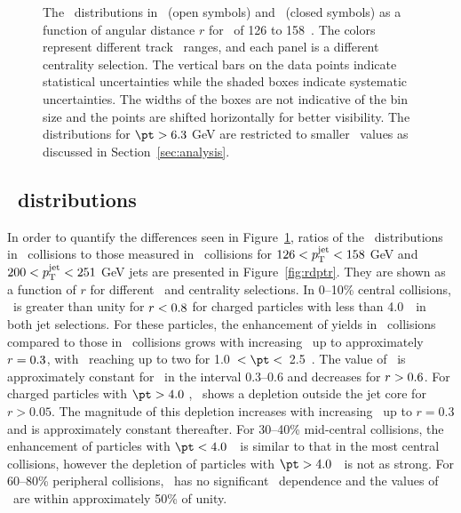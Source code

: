 \begin{figure}[h]
{\begin{tabular}{ccc}
\end{tabular}
}
\caption{The \Dptr\ distributions in \pp\ (open symbols) and \pbpb\ (closed symbols) as a function of angular distance $r$ for \ptjet\ of 126 to 158~\GeV.
The colors represent different track \pt\ ranges, and each panel is a different centrality selection.
The vertical bars on the data points indicate statistical uncertainties while the shaded boxes indicate systematic uncertainties.
The widths of the boxes are not indicative of the bin size and the points are shifted horizontally for better visibility.
The distributions for $\pt > 6.3$ GeV are restricted to smaller \rvar\ values as discussed in Section~\ref{sec:analysis}.}
\label{fig:dptr}
\end{figure}



\subsection{\RDptr\ distributions}
\label{sec:rdptr}
In order to quantify the differences seen in Figure~\ref{fig:dptr}, ratios of the \Dptr\ distributions in \pbpb\ collisions to those measured in \pp\ collisions for $126 < \mbox{$p_{\mathrm{T}}^{\mathrm{jet}}$} < 158$ GeV and $200 < \mbox{$p_{\mathrm{T}}^{\mathrm{jet}}$} < 251$ GeV jets are presented in Figure~\ref{fig:rdptr}.
They are shown as a function of $r$ for different \pt\ and centrality selections.
In 0--10\% central collisions, \RDptr\ is greater than unity for $\mbox{$r$} < 0.8$ for charged particles with \pT less than 4.0~\GeV\ in both jet selections.
For these particles, the enhancement of yields in \pbpb\ collisions compared to those in  \pp\ collisions grows with increasing \rvar\ up to approximately \mbox{$\mbox{$r$}  = 0.3$}, with \RDptr\ reaching up to two for 1.0~$< \pt <$~2.5~\GeV.
The value of \RDptr\ is approximately constant for \rvar\ in the interval \mbox{0.3--0.6} and decreases for \mbox{$\mbox{$r$} > 0.6$}.
For charged particles with $\pt > 4.0$ \GeV, \RDptr\ shows a depletion outside the jet core for $r > 0.05$.
The magnitude of this depletion increases with increasing \rvar\ up to $r = 0.3$ and is approximately constant thereafter.
For 30--40\% mid-central collisions, the enhancement of particles with $\pt < 4.0$~\GeV\ is similar to that in the most central collisions, however the depletion of particles with $\pt > 4.0$~\GeV\ is not as strong.
For 60--80\% peripheral collisions, \RDptr\ has no significant \rvar\ dependence and the values of \RDptr\ are within approximately 50\% of unity.

